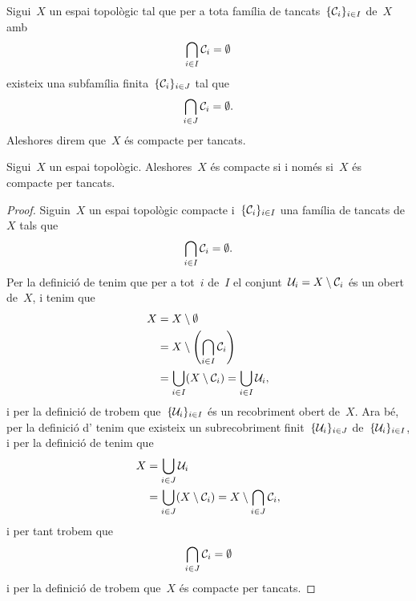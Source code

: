 \documentclass[../../main.tex]{subfiles}
\begin{document}
    \begin{definition}
        \label{def:compacitat per tancats}
        \label{def:compacte per tancats}
        Sigui~\(X\) un espai topològic tal que per a tota família de tancats~\(\{\mathcal{C}_{i}\}_{i\in I}\) de~\(X\) amb
        \[
            \bigcap_{i\in I}\mathcal{C}_{i}=\emptyset
        \]
        existeix una subfamília finita~\(\{\mathcal{C}_{i}\}_{i\in J}\) tal que
        \[
            \bigcap_{i\in J}\mathcal{C}_{i}=\emptyset.
        \]
        Aleshores direm que~\(X\) és compacte per tancats.
    \end{definition}
    \begin{proposition}
        \label{prop:compacte si i només si compacte per tancats}
        \label{prop:equivalència entre compacitat i compacitat per tancats}
        Sigui~\(X\) un espai topològic.
        Aleshores~\(X\) és compacte si i només si~\(X\) és compacte per tancats.
        \begin{proof}
            Siguin~\(X\) un espai topològic compacte i~\(\{\mathcal{C}_{i}\}_{i\in I}\) una família de tancats de~\(X\) tals que
            \[
                \bigcap_{i\in I}\mathcal{C}_{i}=\emptyset.
            \]
            Per la definició de  tenim que per a tot~\(i\) de~\(I\) el conjunt~\(\mathcal{U}_{i}=X\setminus\mathcal{C}_{i}\) és un obert de~\(X\), i tenim que
            \begin{align*}
                X&=X\setminus\emptyset \\
                &=X\setminus\left(\bigcap_{i\in I}\tancat{C}_{i}\right) \\
                &=\bigcup_{i\in I}(X\setminus\tancat{C}_{i})=\bigcup_{i\in I}\obert{U}_{i},
            \end{align*}
            i per la definició de  trobem que~\(\{\mathcal{U}_{i}\}_{i\in I}\) és un recobriment obert de~\(X\).
            Ara bé, per la definició d' tenim que existeix un subrecobriment finit~\(\{\mathcal{U}_{i}\}_{i\in J}\) de~\(\{\mathcal{U}_{i}\}_{i\in I}\), i per la definició de  tenim que
            \begin{align*}
                X&=\bigcup_{i\in J}\mathcal{U}_{i} \\
                &=\bigcup_{i\in J}(X\setminus\mathcal{C}_{i})=X\setminus\bigcap_{i\in J}\mathcal{C}_{i},
            \end{align*} %
            i per tant trobem que
            \[
                \bigcap_{i\in J}\mathcal{C}_{i}=\emptyset
            \]
            i per la definició de  trobem que~\(X\) és compacte per tancats.
        \end{proof}
    \end{proposition}
\end{document}
